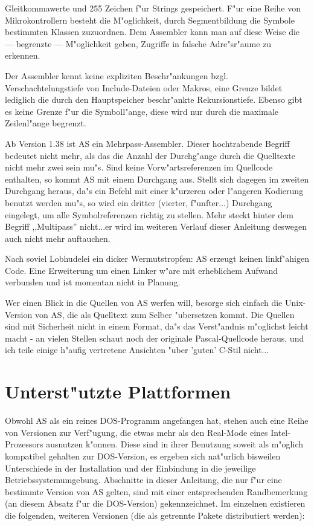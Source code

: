 \documentclass[12pt,a4paper,twoside]{report}
\newcommand{\asname}{AS}
\begin{document}
Gleitkommawerte und 255 Zeichen f"ur Strings gespeichert.  F"ur eine Reihe
von Mikrokontrollern besteht die M"oglichkeit, durch Segmentbildung die
Symbole bestimmten Klassen zuzuordnen.  Dem Assembler kann man auf diese
Weise die --- begrenzte --- M"oglichkeit geben, Zugriffe in falsche
Adre"sr"aume zu erkennen.
\par
Der Assembler kennt keine expliziten Beschr"ankungen bzgl.
Verschachtelungstiefe von Include-Dateien oder Makros, eine Grenze bildet
lediglich die durch den Hauptspeicher beschr"ankte Rekursionstiefe.
Ebenso gibt es keine Grenze f"ur die Symboll"ange, diese wird nur durch
die maximale Zeilenl"ange begrenzt.
\par
Ab Version 1.38 ist \asname{} ein Mehrpass-Assembler.  Dieser hochtrabende Begriff
bedeutet nicht mehr, als das die Anzahl der Durchg"ange durch die Quelltexte
nicht mehr zwei sein mu"s.  Sind keine Vorw"artsreferenzen im Quellcode
enthalten, so kommt \asname{} mit einem Durchgang aus.  Stellt sich dagegen im zweiten
Durchgang heraus, da"s ein Befehl mit einer k"urzeren oder l"angeren Kodierung
benutzt werden mu"s, so wird ein dritter (vierter, f"unfter...) Durchgang
eingelegt, um alle Symbolreferenzen richtig zu stellen.  Mehr steckt hinter dem
Begriff ,,Multipass'' nicht...er wird im weiteren Verlauf dieser Anleitung
deswegen auch nicht mehr auftauchen.
\par
Nach soviel Lobhudelei ein dicker Wermutstropfen: \asname{} erzeugt keinen
linkf"ahigen Code.  Eine Erweiterung um einen Linker w"are mit erheblichem
Aufwand verbunden und ist momentan nicht in Planung.
\par
Wer einen Blick in die Quellen von \asname{} werfen will, besorge sich einfach
die Unix-Version von \asname{}, die als Quelltext zum Selber "ubersetzen kommt.
Die Quellen sind mit Sicherheit nicht in einem Format, da"s das
Verst"andnis m"oglichst leicht macht - an vielen Stellen schaut noch
der originale Pascal-Quellcode heraus, und ich teile einige h"aufig
vertretene Ansichten "uber 'guten' C-Stil nicht...


\section{Unterst"utzte Plattformen}

Obwohl \asname{} als ein reines DOS-Programm  angefangen
hat, stehen auch eine Reihe von Versionen zur Verf"ugung, die etwas mehr
als den Real-Mode eines Intel-Prozessors ausnutzen k"onnen.  Diese sind in
ihrer Benutzung soweit als m"oglich kompatibel gehalten zur DOS-Version,
es ergeben sich nat"urlich bisweilen Unterschiede in der Installation und
der Einbindung in die jeweilige Betriebssystemumgebung.  Abschnitte in
dieser Anleitung, die nur f"ur eine bestimmte Version von \asname{} gelten, sind
mit einer entsprechenden Randbemerkung (an diesem Absatz f"ur die
DOS-Version) gekennzeichnet.  Im einzelnen existieren die folgenden,
weiteren Versionen (die als getrennte Pakete distributiert werden):
\end{document}
